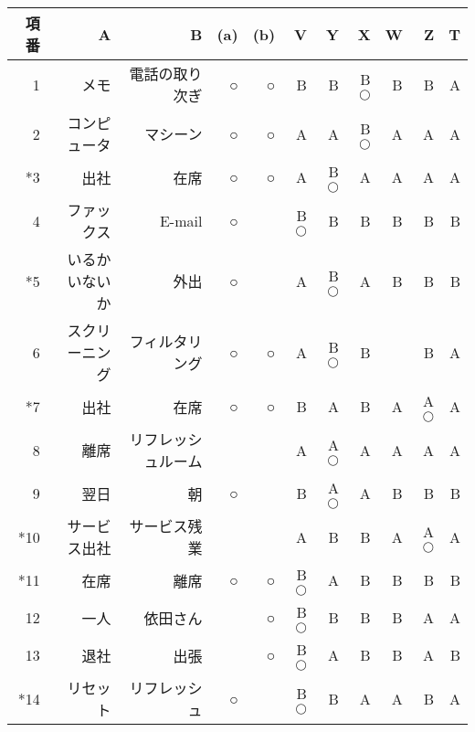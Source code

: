 \begin{table*}
\begin{scriptsize}
\begin{tabular}{|r|r||r|r|r||r|r|r|r|r|r|}	\hline
項番 & A & B & (a) & (b) & V & Y & X & W & Z & T\\	\hline
1 & メモ & 電話の取り次ぎ & ○ & ○ & B & B & B\hspace{-3mm}$\bigcirc$ & B & B & A\\	\hline
2 & コンピュータ & マシーン & ○ & ○ & A & A & B\hspace{-3mm}$\bigcirc$ & A & A & A\\	\hline
*3 & 出社 & 在席 & ○ & ○ & A & B\hspace{-3mm}$\bigcirc$ & A & A & A & A\\	\hline
4 & ファックス & E-mail & ○ & & B\hspace{-3mm}$\bigcirc$ & B & B & B & B & B\\	\hline
*5 & いるかいないか & 外出 & ○ & & A & B\hspace{-3mm}$\bigcirc$ & A & B & B & B\\	\hline
6 & スクリーニング & フィルタリング & ○ & ○ & A & B\hspace{-3mm}$\bigcirc$ & B && B & A\\	\hline
*7 & 出社 & 在席 & ○ & ○ & B & A & B & A & A\hspace{-3mm}$\bigcirc$ & A\\	\hline
8 & 離席 & リフレッシュルーム & & & A & A\hspace{-3mm}$\bigcirc$ & A & A & A & A\\	\hline
9 & 翌日 & 朝 & ○ & & B & A\hspace{-3mm}$\bigcirc$ & A & B & B & B\\	\hline
*10 & サービス出社 & サービス残業 & & & A & B & B & A & A\hspace{-3mm}$\bigcirc$ & A\\	\hline
*11 & 在席 & 離席 & ○ & ○ & B\hspace{-3mm}$\bigcirc$ & A & B & B & B & B\\	\hline
12 & 一人 & 依田さん & & ○ & B\hspace{-3mm}$\bigcirc$ & B & B & B & A & A\\	\hline
13 & 退社 & 出張 & & ○ & B\hspace{-3mm}$\bigcirc$ & A & B & B & A & B\\	\hline
*14 & リセット & リフレッシュ & ○ & & B\hspace{-3mm}$\bigcirc$ & B & A & A & B & A\\	\hline

\end{tabular}
\end{scriptsize}
\end{table*}

